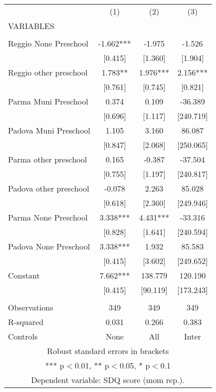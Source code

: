 \begin{tabular}{lccc} \hline
 & (1) & (2) & (3) \\
VARIABLES &  &  &  \\ \hline
 &  &  &  \\
Reggio None Preschool & -1.662*** & -1.975 & -1.526 \\
 & [0.415] & [1.360] & [1.904] \\
Reggio other preschool & 1.783** & 1.976*** & 2.156*** \\
 & [0.761] & [0.745] & [0.821] \\
Parma Muni Preschool & 0.374 & 0.109 & -36.389 \\
 & [0.696] & [1.117] & [240.719] \\
Padova Muni Preschool & 1.105 & 3.160 & 86.087 \\
 & [0.847] & [2.068] & [250.065] \\
Parma other preschool & 0.165 & -0.387 & -37.504 \\
 & [0.755] & [1.197] & [240.817] \\
Padova other preschool & -0.078 & 2.263 & 85.028 \\
 & [0.618] & [2.360] & [249.946] \\
Parma None Preschool & 3.338*** & 4.431*** & -33.316 \\
 & [0.828] & [1.641] & [240.594] \\
Padova None Preschool & 3.338*** & 1.932 & 85.583 \\
 & [0.415] & [3.602] & [249.652] \\
Constant & 7.662*** & 138.779 & 120.190 \\
 & [0.415] & [90.119] & [173.243] \\
 &  &  &  \\
Observations & 349 & 349 & 349 \\
R-squared & 0.031 & 0.266 & 0.383 \\
 Controls & None & All & Inter \\ \hline
\multicolumn{4}{c}{ Robust standard errors in brackets} \\
\multicolumn{4}{c}{ *** p$<$0.01, ** p$<$0.05, * p$<$0.1} \\
\multicolumn{4}{c}{ Dependent variable: SDQ score (mom rep.).} \\
\end{tabular}
